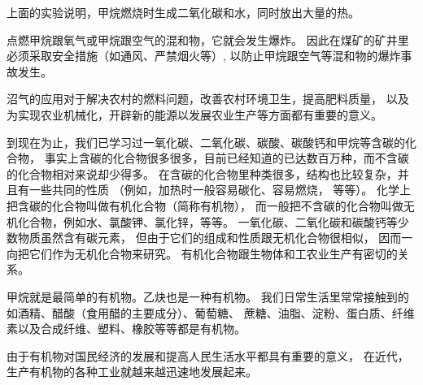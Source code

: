 上面的实验说明，甲烷燃烧时生成二氧化碳和水，同时放出大量的热。
\begin{fangchengshi}
\end{fangchengshi}

点燃甲烷跟氧气或甲烷跟空气的混和物，它就会发生爆炸。
因此在煤矿的矿井里必须采取安全措施（如通风、严禁烟火等）,
以防止甲烷跟空气等混和物的爆炸事故发生。

沼气的应用对于解决农村的燃料问题，改善农村环境卫生，提高肥料质量，
以及为实现农业机械化，开辟新的能源以发展农业生产等方面都有重要的意义。

到现在为止，我们已学习过一氧化碳、二氧化碳、碳酸、碳酸钙和甲烷等含碳的化合物，
事实上含碳的化合物很多很多，目前已经知道的已达数百万种，而不含碳的化合物相对来说却少得多。
在含碳的化合物里种类很多，结构也比较复杂，并且有一些共同的性质
（例如，加热时一般容易碳化、容易燃烧， 等等）。
化学上把含碳的化合物叫做有机化合物（简称有机物），
而一般把不含碳的化合物叫做无机化合物，例如水、氯酸钾、氯化锌，等等。
一氧化碳、二氧化碳和碳酸钙等少数物质虽然含有碳元素，
但由于它们的组成和性质跟无机化合物很相似，
因而一向把它们作为无机化合物来研究。
有机化合物跟生物体和工农业生产有密切的关系。

甲烷就是最简单的有机物。乙炔也是一种有机物。
我们日常生活里常常接触到的如酒精、醋酸（食用醋的主要成分）、葡萄糖、
蔗糖、油脂、淀粉、蛋白质、纤维素以及合成纤维、塑料、橡胶等等都是有机物。

由于有机物对国民经济的发展和提高人民生活水平都具有重要的意义，
在近代，生产有机物的各种工业就越来越迅速地发展起来。


\begin{xiti}



\end{xiti}


